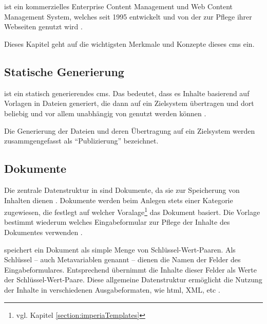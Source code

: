 \section{\imperia}
    \label{section:Imperia}
    {\imperia} ist ein kommerzielles Enterprise Content Management und
    Web Content Management System, welches seit 1995 entwickelt
    \cite{imperia:about, imperia:historie} und von 
    der {\fernUni} zur Pflege ihrer Webseiten genutzt wird
    \cite{fernUni:imperia}.

    Dieses Kapitel geht auf die wichtigsten Merkmale und Konzepte
    dieses \gls{cms} ein.

    \subsection{Statische Generierung}
        \label{section:imperiaStaticGeneration}
        {\imperia} ist ein statisch generierendes \gls{cms}.
        Das bedeutet, dass es Inhalte basierend auf Vorlagen
        in Dateien generiert, die dann auf ein Zielsystem übertragen
        und dort beliebig und vor allem unabhängig von
        {\imperia} genutzt werden können
        \cite[Kapitel 1.1]{imperia:ecmd}.

        Die Generierung der Dateien und deren Übertragung auf ein Zielsystem
        werden zusammgengefasst als "`Publizierung"' bezeichnet.


    \subsection{Dokumente}
        \label{section:imperiaDocuments}
        Die zentrale Datenstruktur in {\imperia} sind Dokumente,
        da sie zur Speicherung von Inhalten dienen
        \cite[Kapitel 1.1]{imperia:ecmd}.
        Dokumente werden beim Anlegen stets einer Kategorie zugewiesen,
        die festlegt auf welcher Voralage\footnote{vgl. Kapitel \ref{section:imperiaTemplates}}
        das Dokument basiert.
        Die Vorlage bestimmt wiederum welches Eingabeformular
        {\editors} zur Pflege der Inhalte des Dokumentes verwenden
        \cite[Kapitel 1.1.4]{imperia:ecmd}.
        
        {\imperia} speichert ein Dokument als simple Menge von
        Schlüssel-Wert-Paaren.
        Als Schlüssel -- auch Metavariablen genannt -- dienen die Namen der Felder des Eingabeformulares.
        Entsprechend übernimmt {\imperia} die Inhalte dieser Felder
        als Werte der Schlüssel-Wert-Paare.
        Diese allgemeine Datenstruktur ermöglicht die Nutzung der Inhalte
        in verschiedenen Ausgabeformaten, wie \gls{html}, XML, etc
        \cite[Kapitel 1.1.2]{imperia:ecmd}.

